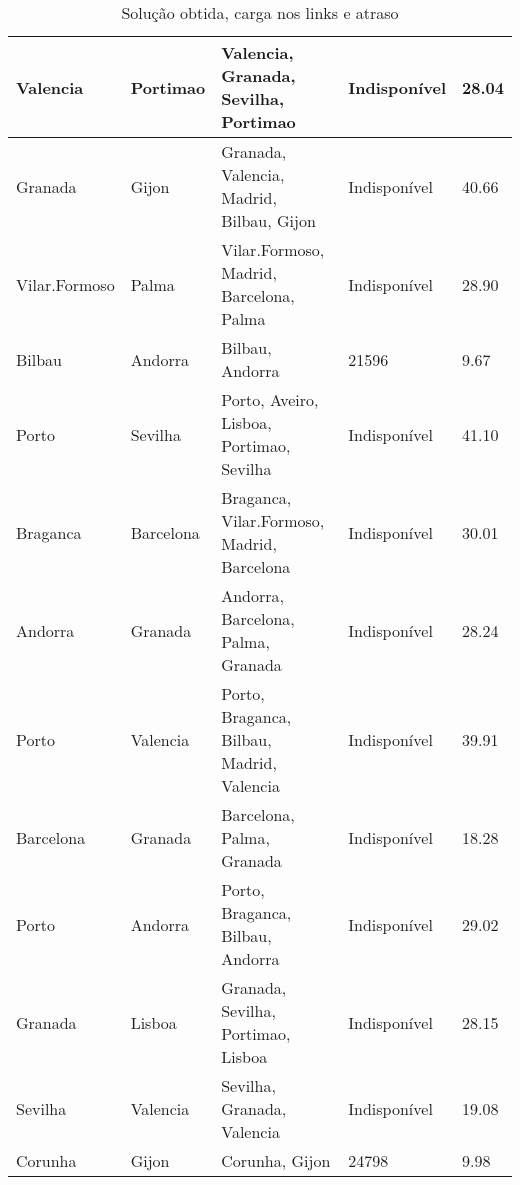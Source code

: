 \begin{table}[!htb]
{\begin{tabular}{|l|l|l|l|l|}
Valencia & Portimao & Valencia, Granada, Sevilha, Portimao & Indisponível & 28.04 \\ \hline
Granada & Gijon & Granada, Valencia, Madrid, Bilbau, Gijon & Indisponível & 40.66 \\ \hline
Vilar.Formoso & Palma & Vilar.Formoso, Madrid, Barcelona, Palma & Indisponível & 28.90 \\ \hline
Bilbau & Andorra & Bilbau, Andorra & 21596 & 9.67 \\ \hline
Porto & Sevilha & Porto, Aveiro, Lisboa, Portimao, Sevilha & Indisponível & 41.10 \\ \hline
Braganca & Barcelona & Braganca, Vilar.Formoso, Madrid, Barcelona & Indisponível & 30.01 \\ \hline
Andorra & Granada & Andorra, Barcelona, Palma, Granada & Indisponível & 28.24 \\ \hline
Porto & Valencia & Porto, Braganca, Bilbau, Madrid, Valencia & Indisponível & 39.91 \\ \hline
Barcelona & Granada & Barcelona, Palma, Granada & Indisponível & 18.28 \\ \hline
Porto & Andorra & Porto, Braganca, Bilbau, Andorra & Indisponível & 29.02 \\ \hline
Granada & Lisboa & Granada, Sevilha, Portimao, Lisboa & Indisponível & 28.15 \\ \hline
Sevilha & Valencia & Sevilha, Granada, Valencia & Indisponível & 19.08 \\ \hline
Corunha & Gijon & Corunha, Gijon & 24798 & 9.98 \\ \hline
\end{tabular}}
\caption[]{Solução obtida, carga nos links e atraso}
\end{table}

\begin{table}[!htb]
        \centering
\caption[]{Solução obtida, carga nos links e atraso}
\end{table}

